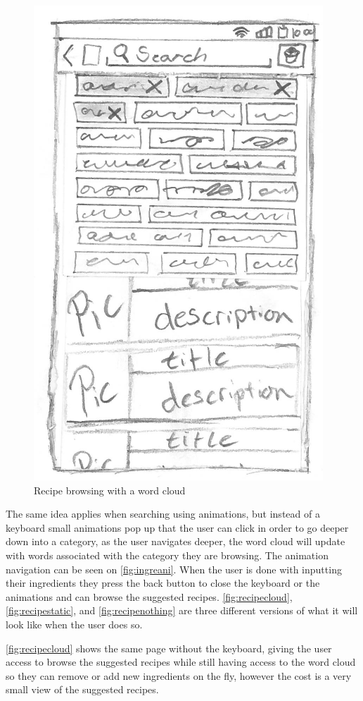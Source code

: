 \begin{figure}[H]
\begin{minipage}[b]{0.5\columnwidth}
\includegraphics[width=0.7\columnwidth]{img/prototypes/recipe_browse.pdf}
\caption{Recipe browsing with a word cloud\label{fig:recipecloud}}
\end{minipage}
\end{figure}

The same idea applies when searching using animations, but instead of a keyboard small animations pop up that the user can click in order to go deeper down into a category, as the user navigates deeper, the word cloud will update with words associated with the category they are browsing. The animation navigation can be seen on \autoref{fig:ingreani}. When the user is done with inputting their ingredients they press the back button to close the keyboard or the animations and can browse the suggested recipes. \autoref{fig:recipecloud}, \autoref{fig:recipestatic}, and \autoref{fig:recipenothing} are three different versions of what it will look like when the user does so.

\autoref{fig:recipecloud} shows the same page without the keyboard, giving the user access to browse the suggested recipes while still having access to the word cloud so they can remove or add new ingredients on the fly, however the cost is a very small view of the suggested recipes. 

